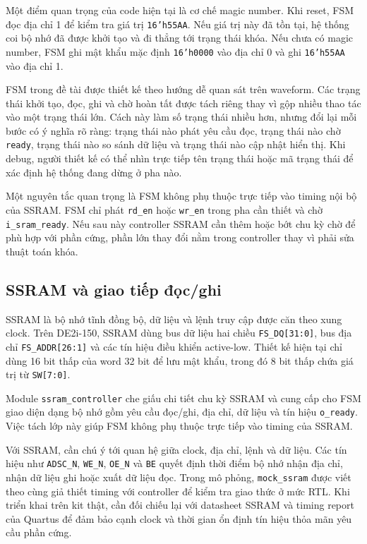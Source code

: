 \documentclass[13pt,a4paper]{article}
\begin{document}
Một điểm quan trọng của code hiện tại là cơ chế magic number. Khi reset, FSM đọc địa chỉ 1 để kiểm tra giá trị \texttt{16'h55AA}. Nếu giá trị này đã tồn tại, hệ thống coi bộ nhớ đã được khởi tạo và đi thẳng tới trạng thái khóa. Nếu chưa có magic number, FSM ghi mật khẩu mặc định \texttt{16'h0000} vào địa chỉ 0 và ghi \texttt{16'h55AA} vào địa chỉ 1.

FSM trong đề tài được thiết kế theo hướng dễ quan sát trên waveform. Các trạng thái khởi tạo, đọc, ghi và chờ hoàn tất được tách riêng thay vì gộp nhiều thao tác vào một trạng thái lớn. Cách này làm số trạng thái nhiều hơn, nhưng đổi lại mỗi bước có ý nghĩa rõ ràng: trạng thái nào phát yêu cầu đọc, trạng thái nào chờ \texttt{ready}, trạng thái nào so sánh dữ liệu và trạng thái nào cập nhật hiển thị. Khi debug, người thiết kế có thể nhìn trực tiếp tên trạng thái hoặc mã trạng thái để xác định hệ thống đang dừng ở pha nào.

Một nguyên tắc quan trọng là FSM không phụ thuộc trực tiếp vào timing nội bộ của SSRAM. FSM chỉ phát \texttt{rd\_en} hoặc \texttt{wr\_en} trong pha cần thiết và chờ \texttt{i\_sram\_ready}. Nếu sau này controller SSRAM cần thêm hoặc bớt chu kỳ chờ để phù hợp với phần cứng, phần lớn thay đổi nằm trong controller thay vì phải sửa thuật toán khóa.

\subsection{SSRAM và giao tiếp đọc/ghi}
SSRAM là bộ nhớ tĩnh đồng bộ, dữ liệu và lệnh truy cập được căn theo xung clock. Trên DE2i-150, SSRAM dùng bus dữ liệu hai chiều \texttt{FS\_DQ[31:0]}, bus địa chỉ \texttt{FS\_ADDR[26:1]} và các tín hiệu điều khiển active-low. Thiết kế hiện tại chỉ dùng 16 bit thấp của word 32 bit để lưu mật khẩu, trong đó 8 bit thấp chứa giá trị từ \texttt{SW[7:0]}.

Module \texttt{ssram\_controller} che giấu chi tiết chu kỳ SSRAM và cung cấp cho FSM giao diện dạng bộ nhớ gồm yêu cầu đọc/ghi, địa chỉ, dữ liệu và tín hiệu \texttt{o\_ready}. Việc tách lớp này giúp FSM không phụ thuộc trực tiếp vào timing của SSRAM.

Với SSRAM, cần chú ý tới quan hệ giữa clock, địa chỉ, lệnh và dữ liệu. Các tín hiệu như \texttt{ADSC\_N}, \texttt{WE\_N}, \texttt{OE\_N} và \texttt{BE} quyết định thời điểm bộ nhớ nhận địa chỉ, nhận dữ liệu ghi hoặc xuất dữ liệu đọc. Trong mô phỏng, \texttt{mock\_ssram} được viết theo cùng giả thiết timing với controller để kiểm tra giao thức ở mức RTL. Khi triển khai trên kit thật, cần đối chiếu lại với datasheet SSRAM và timing report của Quartus để đảm bảo cạnh clock và thời gian ổn định tín hiệu thỏa mãn yêu cầu phần cứng.
\end{document}
